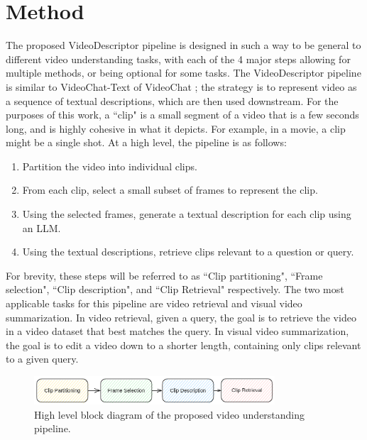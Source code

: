 \section{Method}


The proposed VideoDescriptor pipeline is designed in such a way to be general to different video understanding tasks, with each of the 4 major steps allowing for multiple methods, or being optional for some tasks.
The VideoDescriptor pipeline is similar to VideoChat-Text of VideoChat \cite{videochat}; the strategy is to represent video as a sequence of textual descriptions, which are then used downstream.
For the purposes of this work, a ``clip" is a small segment of a video that is a few seconds long, 
and is highly cohesive in what it depicts. For example, in a movie, a clip might be a single shot.
At a high level, the pipeline is as follows:
\begin{enumerate}
      \item Partition the video into individual clips.
      \item From each clip, select a small subset of frames to represent the clip.
      \item Using the selected frames, generate a textual description for each clip using an LLM.
      \item Using the textual descriptions, retrieve clips relevant to a question or query.
\end{enumerate}

For brevity, these steps will be referred to as ``Clip partitioning", ``Frame selection", ``Clip description", and ``Clip Retrieval" respectively.
The two most applicable tasks for this pipeline are video retrieval and visual video summarization.
In video retrieval, given a query, the goal is to retrieve the video in a video dataset that best matches the query.
In visual video summarization, the goal is to edit a video down to a shorter length, containing only clips relevant to a given query.

\begin{figure}[h]
      \centering
      \includegraphics[width=0.8\textwidth]{figures/pipeline.png}
      \caption{High level block diagram of the proposed video understanding pipeline.}
      \label{fig:pipeline}
\end{figure}



